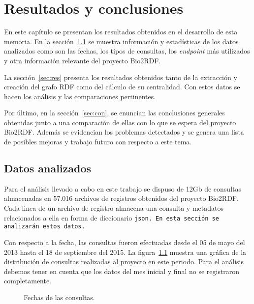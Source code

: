 \chapter{Resultados y conclusiones}
En este capítulo se presentan los resultados obtenidos en el desarrollo de esta
memoria.
En la sección~\ref{sec:datos} se muestra información y estadísticas de los datos
analizados como son las fechas, los tipos de consultas, los \emph{endpoint} más
utilizados y otra información relevante del proyecto Bio2RDF.

La sección~\ref{sec:res} presenta los resultados obtenidos tanto de la
extracción y creación del grafo RDF como del cálculo de su centralidad. Con
estos datos se hacen los análisis y las comparaciones pertinentes.

Por último, en la sección~\ref{sec:con}, se enuncian las conclusiones generales
obtenidas junto a una comparación de ellas con lo que se espera del proyecto
Bio2RDF. Además se evidencian los problemas detectados y se genera una lista de
posibles mejoras y trabajo futuro con respecto a este tema.


\section{Datos analizados}\label{sec:datos}
Para el análisis llevado a cabo en este trabajo se dispuso de 12Gb de consultas
almacenadas en 57.016 archivos de registros obtenidos del proyecto Bio2RDF.
Cada linea de un archivo de registro almacena una consulta y metadatos 
relacionados a ella en forma de diccionario \tt{json}. En esta sección se
analizarán estos datos.

Con respecto a la fecha, las consultas fueron efectuadas desde el 05 de mayo del
2013 hasta el 18 de septiembre del 2015.
La figura~\ref{fig:dates} muestra una gráfica de la distribución de consultas
realizadas al proyecto en este periodo.
Para el análisis debemos tener en cuenta que los datos del mes inicial y final
no se registraron completamente.

\begin{figure}[ht]
  \caption{Fechas de las consultas.}\label{fig:dates}
\end{figure}

